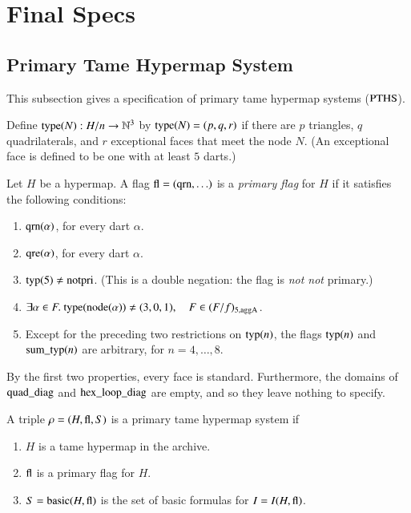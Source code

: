 \section{Final Specs}


\subsection{Primary Tame Hypermap System}
\label{sec:PTHS}

This subsection gives a specification of primary tame hypermap
systems (${\operatorname{PTHS}}$).

Define ${\operatorname{type}}(N):H/n\to\mathbb{N}^3$ by ${\operatorname{type}}(N) = (p,q,r)$
if there are $p$ triangles, $q$ quadrilaterals, and $r$
exceptional faces that meet the node $N$.  (An exceptional face is
defined to be one with at least $5$ darts.)


\begin{definition}
Let $H$ be a hypermap.  A flag ${\operatorname{fl}} = ({\operatorname{qrn}},\ldots)$ is a
{\it primary flag} for $H$ if it satisfies the following
conditions:
    \begin{enumerate}
        \item ${\operatorname{qrn}}(\alpha)$, for every dart $\alpha$.
        \item ${\operatorname{qre}}(\alpha)$, for every dart $\alpha$.
        \item ${\operatorname{typ}}(5)\ne{\operatorname{notpri}}$.  (This is a double negation: the flag is
        {\it not not\/} primary.)
        \item $\exists\alpha\in F.\ \op{type}(\op{node}(\alpha)) \ne
    (3,0,1),\quad F\in (F/f)_{5,\op{aggA}}$.
        \item Except for the preceding two restrictions on ${\operatorname{typ}}(n)$, the flags
        ${\operatorname{typ}}(n)$ and ${\operatorname{sum\_typ}}(n)$ are arbitrary, for $n=4,\ldots,8$.
    \end{enumerate}
\end{definition}

\begin{remark} By the first two properties, every face is
standard.  Furthermore, the domains of ${\operatorname{quad\_diag}}$ and
${\operatorname{hex\_loop\_diag}}$ are empty, and so they leave nothing to
specify.
\end{remark}

\begin{definition}
A triple $\rho=(H,{\operatorname{fl}},S)$ is a primary tame hypermap system if
    \begin{enumerate}
    \item $H$ is a tame hypermap in the archive.
    \item ${\operatorname{fl}}$ is a primary flag for $H$.
    \item $S={\operatorname{basic}}(H,{\operatorname{fl}})$ is the set of basic formulas for $I=I(H,{\operatorname{fl}})$.
    \end{enumerate}
\end{definition}


